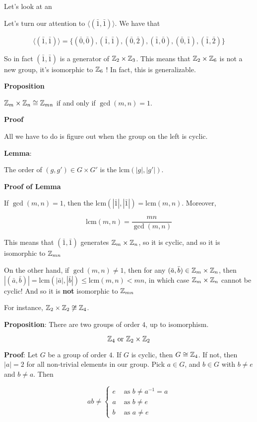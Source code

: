 \documentclass[12pt]{article}
\newcommand{\lcm}{\text{lcm}}
\newcommand{\lr}[1]{\langle #1 \rangle}
\begin{document}
Let's look at an

\example {
  \[
    \Z_2 \times \Z_3 = \{ (\bar 0, \bar 0), (\bar 1, \bar 0), (\bar 0, \bar 1),
    (\bar 0, \bar 2), (\bar 1, \bar 2) \}
  \]
}

Let's turn our attention to $\lr { (\bar 1, \bar 1) }$. We have that

\[
  \lr { (\bar 1, \bar 1) } = \{ (\bar 0, \bar 0), (\bar 1, \bar 1), (\bar 0, \bar
  2), (\bar 1, \bar 0), (\bar 0, \bar 1), (\bar 1, \bar 2) \}
\]

So in fact $(\bar 1, \bar 1)$ is a generator of ${\mathbb Z}_2 \times {\mathbb Z}_3$. This means
that ${\mathbb Z}_2 \times {\mathbb Z}_6$ is not a new group, it's isomorphic to ${\mathbb Z}_6$ ! In fact,
this is generalizable.

{\bf Proposition}

${\mathbb Z}_m \times {\mathbb Z}_n \cong {\mathbb Z}_{mn}$ if and only if $\gcd(m, n) = 1$.

{\bf Proof}

All we have to do is figure out when the group on the left is cyclic.

{\bf Lemma}:

The order of $(g, g') \in G \times G'$ is the $\lcm(|g|, |g'|)$.

{\bf Proof of Lemma}

If $\gcd(m, n) = 1$, then the $\lcm(|\bar 1|, |\bar 1|) = \lcm(m, n)$. Moreover,

\[
  \lcm(m, n) = \frac{mn}{\gcd(m, n)}
\]

This means that $(\bar 1, \bar 1)$ generates ${\mathbb Z}_m \times {\mathbb Z}_n$, so it is
cyclic, and so it is isomorphic to ${\mathbb Z}_{mn}$

On the other hand, if $\gcd(m, n) \ne 1$, then for any $(\bar a, \bar b) \in
{\mathbb Z}_m \times {\mathbb Z}_n$, then $|(\bar a, \bar b)| = \lcm(|\bar a|, |\bar b|) \le
\lcm(m, n) < mn$, in which case ${\mathbb Z}_m \times {\mathbb Z}_n$ cannot be cyclic! And so it
is {\bf not} isomorphic to ${\mathbb Z}_{mn}$

For instance, ${\mathbb Z}_2 \times {\mathbb Z}_2 \not\cong {\mathbb Z}_4$.

{\bf Proposition}: There are two groups of order $4$, up to isomorphism.

\[
  {\mathbb Z}_4 \text{ or } {\mathbb Z}_2 \times {\mathbb Z}_2
\]

{\bf Proof}: Let $G$ be a group of order $4$. If $G$ is cyclic, then $G \cong
{\mathbb Z}_4$. If not, then $|a| = 2$ for all non-trivial elements in our group. Pick $a
\in G$, and $b \in G$ with $b \ne e$ and $b \ne a$. Then

\[
  ab \ne \begin{cases}
    e & \text{ as } b \ne a^{-1} = a \\
    a & \text{ as } b \ne e \\
    b & \text{ as } a \ne e
  \end{cases}
\]
\end{document}
